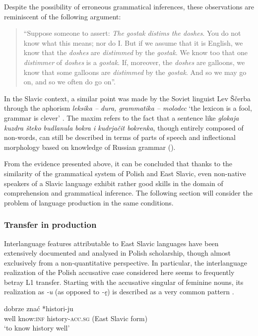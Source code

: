 \documentclass[output=paper,            colorlinks, citecolor=brown            		  ]{langscibook}
\begin{document}
Despite the possibility of erroneous grammatical inferences, these observations are reminiscent of the following argument: 

\begin{quote}
“Suppose someone to assert: \textit{The gostak distims the doshes}. You do not know what this means; nor do I. But if we assume that it is English, we know that the \textit{doshes} are \textit{distimmed} by the \textit{gostak}. We know too that one \textit{distimmer} of \textit{doshes} is a \textit{gostak}. If, moreover, the \textit{doshes} are galloons, we know that some galloons are \textit{distimmed} by the \textit{gostak}. And so we may go on, and so we often do go on”. \hbox{}\hfill\hbox{\citep[46]{OgdenRichards1923}}
\end{quote}

In the Slavic context, a similar point was made by the Soviet linguist Lev Ščerba through the aphorism \textit{leksika -- dura, grammatika -- molodec} ‘the lexicon is a fool, grammar is clever’ \citep[88]{Ščerba1974}. The maxim refers to the fact that a sentence like \textit{glokaja kuzdra šteko budlanula bokra i kudrjačit bokrenka}, though entirely composed of non-words, can still be described in terms of parts of speech and inflectional morphology based on knowledge of Russian grammar (\citealt[247--252]{Uspenskij1954}). 

From the evidence presented above, it can be concluded that thanks to the similarity of the grammatical system of Polish and East Slavic, even non-native speakers of a Slavic language exhibit rather good skills in the domain of comprehension and grammatical inference. The following section will consider the problem of language production in the same conditions. 

\subsubsection{Transfer in production}
\label{sec:saturno:2.4.2}
Interlanguage features attributable to East Slavic languages have been extensively documented and analysed in Polish scholarship, though almost exclusively from a non-quantitative perspective. In particular, the interlanguage realization of the Polish accusative case considered here seems to frequently betray L1 transfer. Starting with the accusative singular of feminine nouns, its realization as \textit{{}-u} (as opposed to \textit{-ę}) is described as a very common pattern .

\ea\label{ex:saturno:13}  
\gll dobrze   znać   *histori-ju\\
  well    know:\textsc{inf} {history-\textsc{acc.sg} (East Slavic form)}\\
  \glt ‘to know history well’ 
\z
\end{document}
